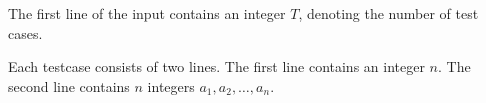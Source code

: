 The first line of the input contains an integer $T$, denoting the number of test cases. 

Each testcase consists of two lines.
The first line contains an integer $n$.
The second line contains $n$ integers $a_1,a_2,\ldots,a_n$.